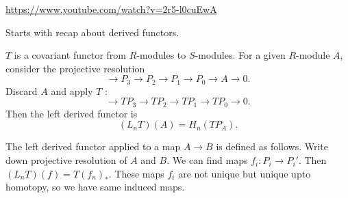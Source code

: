 \url{https://www.youtube.com/watch?v=2r5-l0cuEwA}

Starts with recap about derived functors.

\begin{definition}
$T$ is a covariant functor from $R$-modules to $S$-modules.
For a given $R$-module $A$, consider the projective resolution
\[
\to  P_3 \to  P_2 \to  P_1 \to  P_0 \to A  \to  0
.\] 
Discard $A$ and apply $T$ :
\[
    \to  TP_3 \to  TP_2 \to  TP_1 \to  TP_0 \to  0
.\] 
Then the left derived functor is
\[
    (L_n T)(A) = H_n(TP_A)
.\] 
\end{definition}
The left derived functor applied to a map $A \to  B$ is defined as follows. Write down projective resolution of $A$ and $B$. We can find maps $f_i: P_i \to  P_i'$. Then $(L_n T)(f) = T(f_n)_*$. 
These maps $f_i$ are not unique but unique upto homotopy, so we have same induced maps.

